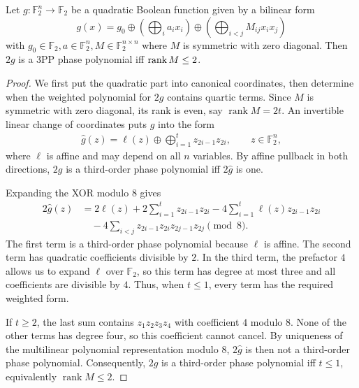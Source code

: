 \begin{lemma} \label{lem:3pp-rank}
    Let $g: \mathbb F_2^n \to \mathbb F_2$ be a quadratic Boolean function given by a bilinear form
    \[ g(x) = g_0 \oplus \left( \bigoplus_i a_i x_i \right) \oplus \left( \bigoplus_{i<j} M_{ij}x_ix_j \right) \]
    with $g_0 \in \mathbb F_2, a\in\mathbb F_2^n, M \in \mathbb F_2^{n\times n}$ where $M$ is symmetric with zero diagonal.
    Then $2g$ is a 3PP phase polynomial iff $\operatorname{rank} M \leq 2$.
\end{lemma}
\begin{proof}
We first put the quadratic part into canonical coordinates, then determine when the weighted polynomial for $2g$ contains quartic terms.
Since $M$ is symmetric with zero diagonal, its rank is even, say $\operatorname{rank}M=2t$.
An invertible linear change of coordinates puts $g$ into the form
\begin{align}
    \hat g(z)
    =\ell(z)\oplus\bigoplus_{i=1}^t z_{2i-1}z_{2i},
    \qquad z\in\mathbb F_2^n,
\end{align}
where $\ell$ is affine and may depend on all $n$ variables.
By affine pullback in both directions, $2g$ is a third-order phase polynomial iff $2\hat g$ is one.

Expanding the XOR modulo $8$ gives
\begin{align}
    2\hat g(z)
    &=2\ell(z)+2\sum_{i=1}^t z_{2i-1}z_{2i}
    -4\sum_{i=1}^t\ell(z)z_{2i-1}z_{2i}\\
    &\quad-4\sum_{i<j}z_{2i-1}z_{2i}z_{2j-1}z_{2j}
    \pmod 8.
\end{align}
The first term is a third-order phase polynomial because $\ell$ is affine.
The second term has quadratic coefficients divisible by $2$.
In the third term, the prefactor $4$ allows us to expand $\ell$ over $\mathbb F_2$, so this term has degree at most three and all coefficients are divisible by $4$.
Thus, when $t\leq 1$, every term has the required weighted form.

If $t\geq 2$, the last sum contains $z_1z_2z_3z_4$ with coefficient $4$ modulo $8$.
None of the other terms has degree four, so this coefficient cannot cancel.
By uniqueness of the multilinear polynomial representation modulo $8$, $2\hat g$ is then not a third-order phase polynomial.
Consequently, $2g$ is a third-order phase polynomial iff $t\leq 1$, equivalently $\operatorname{rank}M\leq 2$.
\end{proof}
